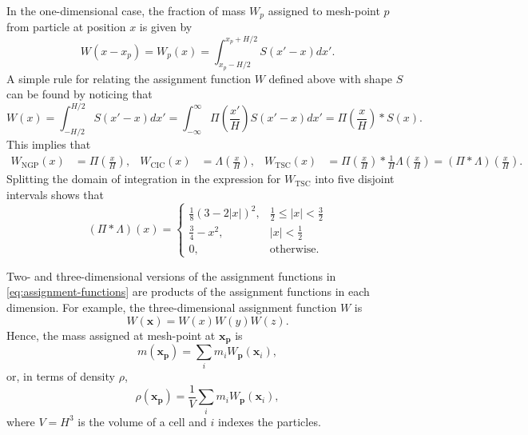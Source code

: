 In the one-dimensional case, the fraction of mass $W_p$ assigned to mesh-point $p$ from particle at position $x$ is given by
\begin{equation*}
    W(x-x_p) = W_p(x) = \int_{x_p-H/2}^{x_p+H/2} S(x'-x)dx'.
\end{equation*}
A simple rule for relating the assignment function $W$ defined above with shape $S$ can be found by noticing that
\begin{equation*}
    W(x) = \int_{-H/2}^{H/2}S(x'-x)dx' = \int_{-\infty}^\infty \Pi\left(\frac{x'}{H}\right)S(x'-x)dx' = \Pi\left(\frac{x}{H}\right) * S(x).
\end{equation*}
This implies that
\begin{align}\label{eq:assignment-functions}
    W_\text{NGP}(x) & = \Pi\left(\frac{x}{H}\right), & W_\text{CIC}(x) & =  \Lambda\left(\frac{x}{H}\right), & W_\text{TSC}(x) & = \Pi\left(\frac{x}{H}\right) * \frac{1}{H} \Lambda\left(\frac{x}{H}\right) = (\Pi * \Lambda)\left(\frac{x}{H}\right).
\end{align}
Splitting the domain of integration in the expression for $W_\text{TSC}$ into five disjoint intervals shows that
\begin{equation*}
    (\Pi * \Lambda)(x) = \begin{cases}
        \frac{1}{8}(3-2|x|)^2, & \frac{1}{2} \leq |x| < \frac{3}{2} \\
        \frac{3}{4}-x^2,       & |x| < \frac{1}{2}                  \\
        0,                     & \text{otherwise}.
    \end{cases}
\end{equation*}

Two- and three-dimensional versions of the assignment functions in \autoref{eq:assignment-functions} are products of the assignment functions in each dimension.
For example, the three-dimensional assignment function $W$ is
\begin{equation*}
    W(\mathbf{x}) = W(x)W(y)W(z).
\end{equation*}
Hence, the mass assigned at mesh-point at $\mathbf{x}_\mathbf{p}$ is
\begin{equation*}
    m(\mathbf{x}_\mathbf{p}) = \sum_i m_i W_\mathbf{p}(\mathbf{x}_i),
\end{equation*}
or, in terms of density $\rho$,
\begin{equation}\label{eq:density-assignment}
    \rho(\mathbf{x}_\mathbf{p}) = \frac{1}{V} \sum_i m_i W_\mathbf{p}(\mathbf{x}_i),
\end{equation}
where $V = H^3$ is the volume of a cell and $i$ indexes the particles.

